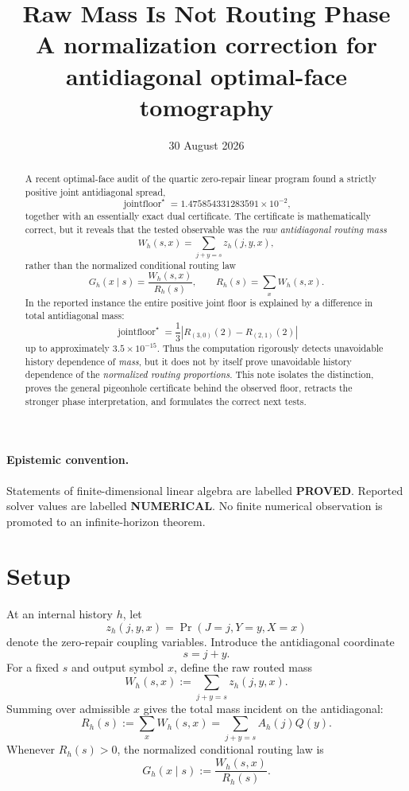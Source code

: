 \documentclass[11pt,a4paper]{article}
\title{\textbf{Raw Mass Is Not Routing Phase}\\
\large A normalization correction for antidiagonal optimal-face tomography}
\author{}
\date{30 August 2026}
\newcommand{\jointfloor}{\operatorname{jointfloor}}
\newcommand{\PROVED}{\textcolor{green!45!black}{\textbf{PROVED}}}
\newcommand{\NUM}{\textcolor{blue!70!black}{\textbf{NUMERICAL}}}
\begin{document}
\maketitle

\begin{abstract}
A recent optimal-face audit of the quartic zero-repair linear program found a
strictly positive joint antidiagonal spread,
\[
\jointfloor^\star
=
1.475854331283591\times 10^{-2},
\]
together with an essentially exact dual certificate.  The certificate is
mathematically correct, but it reveals that the tested observable was the
\emph{raw antidiagonal routing mass}
\[
W_h(s,x)
=
\sum_{j+y=s} z_h(j,y,x),
\]
rather than the normalized conditional routing law
\[
G_h(x\mid s)
=
\frac{W_h(s,x)}{R_h(s)},
\qquad
R_h(s)=\sum_x W_h(s,x).
\]
In the reported instance the entire positive joint floor is explained by a
difference in total antidiagonal mass:
\[
\jointfloor^\star
=
\frac{1}{3}
\left|
R_{(3,0)}(2)-R_{(2,1)}(2)
\right|
\]
up to approximately \(3.5\times10^{-15}\).
Thus the computation rigorously detects unavoidable history dependence of
\emph{mass}, but it does not by itself prove unavoidable history dependence of
the \emph{normalized routing proportions}.  This note isolates the distinction,
proves the general pigeonhole certificate behind the observed floor, retracts
the stronger phase interpretation, and formulates the correct next tests.
\end{abstract}

\paragraph{Epistemic convention.}
Statements of finite-dimensional linear algebra are labelled \PROVED.
Reported solver values are labelled \NUM.
No finite numerical observation is promoted to an infinite-horizon theorem.

\section{Setup}

At an internal history \(h\), let
\[
z_h(j,y,x)
=
\Pr(J=j,Y=y,X=x)
\]
denote the zero-repair coupling variables.  Introduce the antidiagonal
coordinate
\[
s=j+y.
\]
For a fixed \(s\) and output symbol \(x\), define the raw routed mass
\begin{equation}
\boxed{
W_h(s,x)
:=
\sum_{j+y=s} z_h(j,y,x).
}
\tag{1}
\end{equation}
Summing over admissible \(x\) gives the total mass incident on the
antidiagonal:
\begin{equation}
\boxed{
R_h(s)
:=
\sum_x W_h(s,x)
=
\sum_{j+y=s} A_h(j)Q(y).
}
\tag{2}
\end{equation}
Whenever \(R_h(s)>0\), the normalized conditional routing law is
\begin{equation}
\boxed{
G_h(x\mid s)
:=
\frac{W_h(s,x)}{R_h(s)}.
}
\tag{3}
\end{equation}
\end{document}
